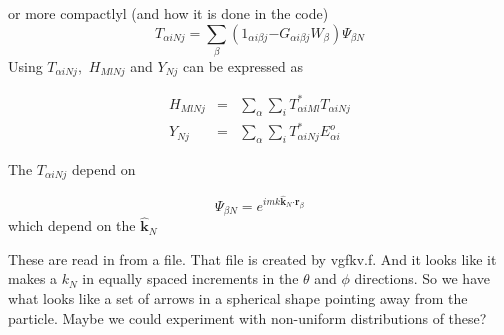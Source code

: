 \documentclass{article}
\begin{document}
or more compactlyl (and how it is done in the code) 
\begin{equation}
T_{\alpha iNj}=\sum_{\beta }\left( 1_{\alpha i\beta j}\mathbf{-}G_{\alpha
i\beta j}W_{\beta }\right) \Psi _{\beta N}
\end{equation}%
Using $T_{\alpha iNj},$ $H_{MlNj}$ and $Y_{Nj}$ can be expressed as

\begin{eqnarray}
H_{MlNj} &=&\sum_{\alpha }\sum_{i}T_{\alpha iMl}^{\ast }T_{\alpha iNj}
\label{HTYT} \\
Y_{Nj} &=&\sum_{\alpha }\sum_{i}T_{\alpha iNj}^{\ast }E_{\alpha i}^{o} 
\nonumber
\end{eqnarray}

The $T_{\alpha iNj}$ depend on

\begin{equation}
\Psi _{\beta N}=e^{imk\mathbf{\hat{k}}_{N}\mathbf{\cdot r}_{\beta }}
\end{equation}%
which depend on the $\mathbf{\hat{k}}_{N}$

These are read in from a file. That file is created by vgfkv.f. And it looks
like it makes a $k_{N}$ in equally spaced increments in the $\theta $ and $%
\phi $ directions. So we have what looks like a set
of arrows in a spherical shape pointing away from the particle. Maybe we
could experiment with non-uniform distributions of these? 
\end{document}
